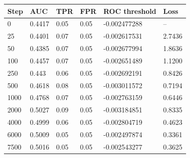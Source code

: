 \begin{tabular}{llllll}
\toprule
Step & AUC & TPR & FPR & ROC threshold & Loss \\
\midrule
0 & 0.4417 & 0.05 & 0.05 & -0.002477288 & -- \\
25 & 0.4401 & 0.07 & 0.05 & -0.002617531 & 2.7436 \\
50 & 0.4385 & 0.07 & 0.05 & -0.002677994 & 1.8636 \\
100 & 0.4457 & 0.07 & 0.05 & -0.002651489 & 1.1200 \\
250 & 0.443 & 0.06 & 0.05 & -0.002692191 & 0.8426 \\
500 & 0.4618 & 0.08 & 0.05 & -0.003011572 & 0.7194 \\
1000 & 0.4768 & 0.07 & 0.05 & -0.002763159 & 0.6446 \\
2000 & 0.5027 & 0.09 & 0.05 & -0.003184851 & 0.8335 \\
4000 & 0.4999 & 0.06 & 0.05 & -0.002804719 & 0.4623 \\
6000 & 0.5009 & 0.05 & 0.05 & -0.002497874 & 0.3361 \\
7500 & 0.5016 & 0.05 & 0.05 & -0.002543277 & 0.3625 \\
\bottomrule
\end{tabular}
